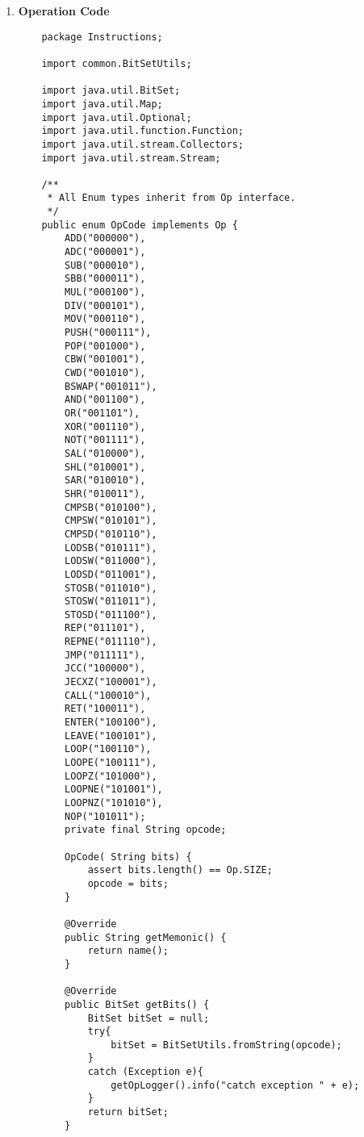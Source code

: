 \documentclass[12pt]{extarticle}
\begin{document}
\begin{enumerate}
\begin{lstlisting}
        private static Map<String, Register> nameToRegister =
                Stream.of(values()).collect(Collectors.toMap(Register::getRegisterName, Function.identity()));
    
        public static Optional<Register> fromName(String name) {
            return Optional.ofNullable(nameToRegister.get(name.toLowerCase()));
        }
    }
    \end{lstlisting}
    \item\textbf {Operation Code} \\
    \begin{lstlisting}
    package Instructions;
    
    import common.BitSetUtils;
    
    import java.util.BitSet;
    import java.util.Map;
    import java.util.Optional;
    import java.util.function.Function;
    import java.util.stream.Collectors;
    import java.util.stream.Stream;
    
    /**
     * All Enum types inherit from Op interface.
     */
    public enum OpCode implements Op {
        ADD("000000"),
        ADC("000001"),
        SUB("000010"),
        SBB("000011"),
        MUL("000100"),
        DIV("000101"),
        MOV("000110"),
        PUSH("000111"),
        POP("001000"),
        CBW("001001"),
        CWD("001010"),
        BSWAP("001011"),
        AND("001100"),
        OR("001101"),
        XOR("001110"),
        NOT("001111"),
        SAL("010000"),
        SHL("010001"),
        SAR("010010"),
        SHR("010011"),
        CMPSB("010100"),
        CMPSW("010101"),
        CMPSD("010110"),
        LODSB("010111"),
        LODSW("011000"),
        LODSD("011001"),
        STOSB("011010"),
        STOSW("011011"),
        STOSD("011100"),
        REP("011101"),
        REPNE("011110"),
        JMP("011111"),
        JCC("100000"),
        JECXZ("100001"),
        CALL("100010"),
        RET("100011"),
        ENTER("100100"),
        LEAVE("100101"),
        LOOP("100110"),
        LOOPE("100111"),
        LOOPZ("101000"),
        LOOPNE("101001"),
        LOOPNZ("101010"),
        NOP("101011");
        private final String opcode;
    
        OpCode( String bits) {
            assert bits.length() == Op.SIZE;
            opcode = bits;
        }
    
        @Override
        public String getMemonic() {
            return name();
        }
    
        @Override
        public BitSet getBits() {
            BitSet bitSet = null;
            try{
                bitSet = BitSetUtils.fromString(opcode);
            }
            catch (Exception e){
                getOpLogger().info("catch exception " + e);
            }
            return bitSet;
        }
    

\end{lstlisting}
\end{enumerate}
\end{document}
